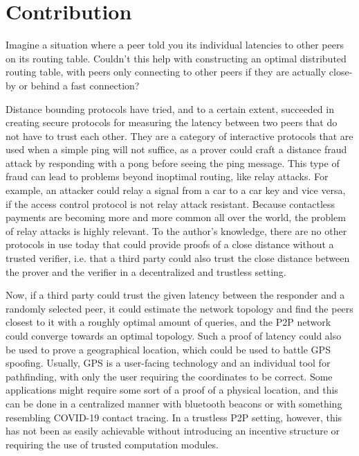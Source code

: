 \section{Contribution}
Imagine a situation where a peer told you its individual latencies to other peers on its routing table. Couldn't this help with constructing an optimal distributed routing table, with peers only connecting to other peers if they are actually close-by or behind a fast connection?

Distance bounding protocols have tried, and to a certain extent, succeeded in creating secure protocols for measuring the latency between two peers that do not have to trust each other. They are a category of interactive protocols that are used when a simple ping will not suffice, as a prover could craft a distance fraud attack by responding with a pong before seeing the ping message. This type of fraud can lead to problems beyond inoptimal routing, like relay attacks. For example, an attacker could relay a signal from a car to a car key and vice versa, if the access control protocol is not relay attack resistant. Because contactless payments are becoming more and more common all over the world, the problem of relay attacks is highly relevant. To the author's knowledge, there are no other protocols in use today that could provide proofs of a close distance without a trusted verifier, i.e. that a third party could also trust the close distance between the prover and the verifier in a decentralized and trustless setting.

Now, if a third party could trust the given latency between the responder and a randomly selected peer, it could estimate the network topology and find the peers closest to it with a roughly optimal amount of queries, and the P2P network could converge towards an optimal topology. Such a proof of latency could also be used to prove a geographical location, which could be used to battle GPS spoofing. Usually, GPS is a user-facing technology and an individual tool for pathfinding, with only the user requiring the coordinates to be correct. Some applications might require some sort of a proof of a physical location, and this can be done in a centralized manner with bluetooth beacons or with something resembling COVID-19 contact tracing. In a trustless P2P setting, however, this has not been as easily achievable without introducing an incentive structure or requiring the use of trusted computation modules.

